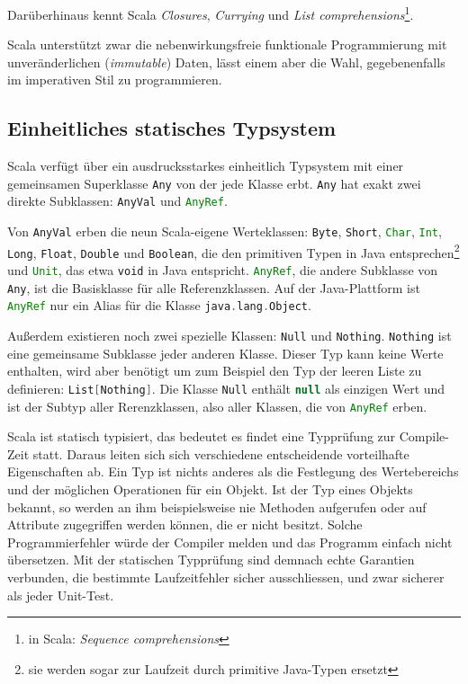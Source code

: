 \documentclass[a4paper, 12pt, hidelinks, listof=totoc, listoftables=totoc, bibliography=totoc]{scrreprt}
\newcommand{\scala}[1]{\lstinline[language=Scala, style=inline]|#1|}
\begin{document}
Darüberhinaus kennt Scala \textit{Closures}, \textit{Currying} und \textit{List comprehensions}\footnote{in Scala: \textit{Sequence comprehensions}}.

Scala unterstützt zwar die nebenwirkungsfreie funktionale Programmierung mit unveränderlichen (\textit{immutable}) Daten, lässt einem aber die Wahl, gegebenenfalls im imperativen Stil zu programmieren.\cite[S. 6 ff.]{piepmeyer2010.GFP}\cite[S. 10 ff.]{odersky2008.PIS}

\subsection{Einheitliches statisches Typsystem}

Scala verfügt über ein ausdrucksstarkes einheitlich Typsystem mit einer gemeinsamen Superklasse \scala{Any} von der jede Klasse erbt. \scala{Any} hat exakt zwei direkte Subklassen: \scala{AnyVal} und \scala{AnyRef}. 

Von \scala{AnyVal} erben die neun Scala-eigene Werteklassen: \scala{Byte}, \scala{Short}, \scala{Char}, \scala{Int}, \scala{Long}, \scala{Float}, \scala{Double} und \scala{Boolean}, die den primitiven Typen in Java entsprechen\footnote{sie werden sogar zur Laufzeit durch primitive Java-Typen ersetzt} und \scala{Unit}, das etwa \scala{void} in Java entspricht. \scala{AnyRef}, die andere Subklasse von \scala{Any}, ist die Basisklasse für alle Referenzklassen. Auf der Java-Plattform ist \scala{AnyRef} nur ein Alias für die Klasse \scala{java.lang.Object}. 

Außerdem existieren noch zwei spezielle Klassen: \scala{Null} und \scala{Nothing}. \scala{Nothing} ist eine gemeinsame Subklasse jeder anderen Klasse. Dieser Typ kann keine Werte enthalten, wird aber benötigt um zum Beispiel den Typ der leeren Liste zu definieren: \scala{List[Nothing]}. Die Klasse \scala{Null} enthält \scala{null} als einzigen Wert und ist der Subtyp aller Rerenzklassen, also aller Klassen, die von \scala{AnyRef} erben.

Scala ist statisch typisiert, das bedeutet es findet eine Typprüfung zur Compile-Zeit statt. Daraus leiten sich sich verschiedene entscheidende vorteilhafte Eigenschaften ab. Ein Typ ist nichts anderes als die Festlegung des Wertebereichs und der möglichen Operationen für ein Objekt. Ist der Typ eines Objekts bekannt, so werden an ihm beispielsweise nie Methoden aufgerufen oder auf Attribute zugegriffen werden können, die er nicht besitzt. Solche Programmierfehler würde der Compiler melden und das Programm einfach nicht übersetzen. Mit der statischen Typprüfung sind demnach echte Garantien verbunden, die bestimmte Laufzeitfehler sicher ausschliessen, und zwar sicherer als jeder Unit-Test.
\end{document}
